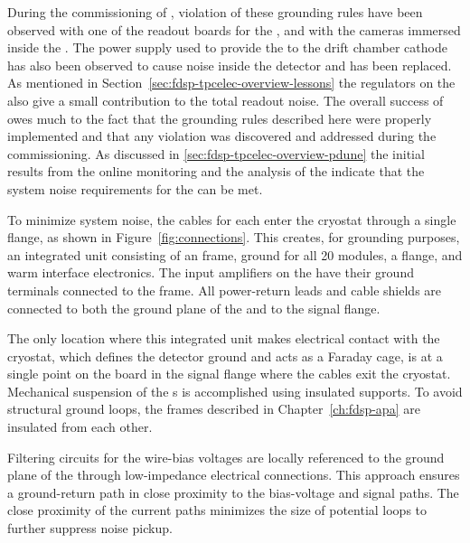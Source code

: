 During the commissioning of , violation of these
grounding rules have been observed with one of the readout
boards for the , and with the cameras immersed
inside the \lar. The power supply used to provide the  to the drift chamber cathode has also been observed
to cause noise inside the detector and has been replaced.
As mentioned in Section~\ref{sec:fdsp-tpcelec-overview-lessons}
the  regulators on the  also give
a small contribution to the total readout noise. The overall 
success of  owes much to the fact that the
grounding rules described here were properly implemented
and that any violation was discovered and addressed during
the commissioning. 
As discussed in \ref{sec:fdsp-tpcelec-overview-pdune}
the initial results from the online monitoring and the
analysis of the  indicate that the system
noise requirements for the  
can be met.

To minimize system noise, the  cables for each  
enter the cryostat through a single  flange, as shown in 
Figure~\ref{fig:connections}. This creates, for grounding purposes, 
an integrated unit consisting of an  frame, 
ground for all \num{20}  modules, a  flange, and 
warm interface electronics. %
The input amplifiers on the 
  have their ground terminals connected to 
the  frame. All power-return leads and cable shields are 
connected to both the ground plane of the  and to the 
 signal flange.

The only location where this integrated unit makes electrical contact 
with the cryostat, which defines the detector ground and acts as a 
Faraday cage, is at a single point on the  \fdth board in 
the  signal flange where the cables exit the cryostat. 
Mechanical suspension of the s is accomplished using 
insulated supports. To avoid structural ground loops, the  
frames described in Chapter~\ref{ch:fdsp-apa} are insulated from 
each other.

Filtering circuits for the  wire-bias voltages are 
locally referenced to the ground plane of the  
through low-impedance electrical connections. This approach 
ensures a ground-return path in close proximity to the 
bias-voltage and signal paths. The close proximity of the 
current paths minimizes the size of potential loops to further 
suppress noise pickup.

